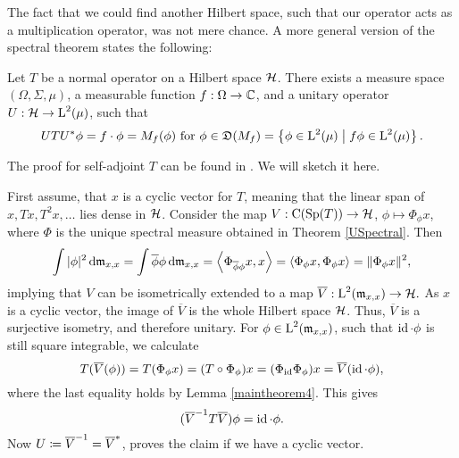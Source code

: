 The fact that we could find another Hilbert space, such that our operator
acts as a multiplication operator, was not mere chance. A more general 
version of the spectral theorem states the following:

\begin{thrm}

Let $T$ be a normal operator on a Hilbert space $\mathcal{H}$. There exists
a measure space $(\Omega, \Sigma, \mu)$, a measurable function 
$f: \Omega \to \mathbb{C}$, and a unitary operator $U: \mathcal{H} \to \text{L}^2(\mu)$,
such that
\[
UTU^{*} \phi = f \cdot \phi = M_f(\phi) \text{ for }\phi \in \mathfrak{D}(M_f) 
 = \left\lbrace \phi \in \text{L}^2(\mu) \bigm | f\phi \in \text{L}^2(\mu) \right\rbrace.
\]
\end{thrm}
The proof for self-adjoint $T$ can be found in \cite[Ch. VII.4]{WernerFunkAna}.
We will sketch it here.

First assume, that $x$ is a cyclic vector for $T$, meaning that 
the linear span of $x, Tx, T^2x, \dots$ lies dense in $\mathcal{H}$. 
Consider the map $V:\operatorname{C}(\operatorname{Sp}(T)) \to \mathcal{H}$, 
$\phi \mapsto \Phi_\phi x$, where $\Phi$ is the unique spectral 
measure obtained in Theorem \ref{USpectral}. Then
\begin{gather*}
 \int |\phi|^2 \operatorname{d}\! \mathfrak{m}_{x,x} = \int \overline{\phi}\phi \operatorname{d}\! \mathfrak{m}_{x,x}
 = \left\langle \Phi_{\overline{\phi} \phi} x, x \right\rangle= \left\langle \Phi_\phi x, \Phi_\phi x \right\rangle 
 = \|\Phi_\phi x \|^2,
\end{gather*}
implying that $V$ can be isometrically extended to a map 
$\overline{V}: \text{L}^2(\mathfrak{m}_{x,x}) \to \mathcal{H}.$ As $x$ is a cyclic vector, 
the image of $\overline{V}$ is the whole Hilbert space $\mathcal{H}$. Thus, 
$\overline{V}$ is a surjective isometry, and therefore unitary. For
$\phi \in \text{L}^2(\mathfrak{m}_{x,x})$, such that $\operatorname{id} \cdot \phi$ is still 
square integrable, we calculate
\[
 T(\overline{V}(\phi))= T(\Phi_\phi x) = (T\circ \Phi_\phi)x = (\Phi_{\operatorname{id}} \Phi_\phi) x
 = \overline{V}(\operatorname{id} \cdot \phi),
\]
where the last equality holds by Lemma \ref{maintheorem4}. This gives
\[
 (\overline{V}^{-1} T \overline{V})\phi = \operatorname{id} \cdot \phi.
\]
Now $U\coloneqq  \overline{V}^{-1} = \overline{V}^{*}$, proves the claim if 
we have a cyclic vector.

